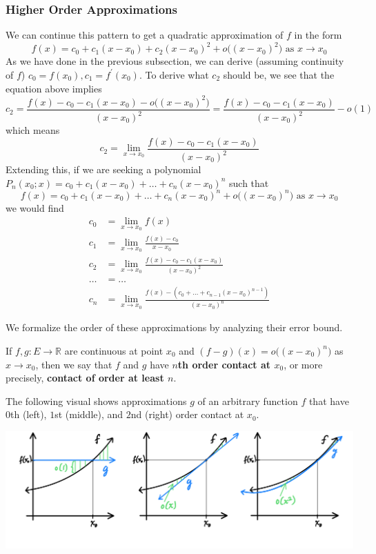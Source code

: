     \subsubsection{Higher Order Approximations}
    We can continue this pattern to get a quadratic approximation of $f$ in the form
    \[f(x) = c_0 + c_1 (x - x_0) + c_2 (x - x_0)^2 + o\big((x - x_0)^2 \big) \text{ as } x \rightarrow x_0\]
    As we have done in the previous subsection, we can derive (assuming continuity of $f$) $c_0 = f(x_0), c_1 = f^\prime (x_0)$. To derive what $c_2$ should be, we see that the equation above implies
    \[c_2 = \frac{f(x) - c_0 - c_1 (x - x_0) - o\big((x - x_0)^2 \big)}{(x - x_0)^2} = \frac{f(x) - c_0 - c_1 (x - x_0)}{(x - x_0)^2} - o(1)\]
    which means
    \[c_2 = \lim_{x \rightarrow x_0} \frac{f(x) - c_0 - c_1 (x - x_0)}{(x - x_0)^2}\]
    Extending this, if we are seeking a polynomial $P_n(x_0; x) = c_0 + c_1 (x - x_0) + \ldots + c_n (x - x_0)^n$ such that
    \[f(x) = c_0 + c_1 (x - x_0) + \ldots + c_n (x - x_0)^n + o\big((x - x_0)^n\big) \text{ as } x \rightarrow x_0\]
    we would find 
    \begin{align*}
        c_0 & = \lim_{x \rightarrow x_0} f(x) \\
        c_1 & = \lim_{x \rightarrow x_0} \frac{f(x) - c_0}{x - x_0} \\
        c_2 & = \lim_{x \rightarrow x_0} \frac{f(x) - c_0 - c_1 (x - x_0)}{(x - x_0)^2} \\
        \ldots & = \ldots \\
        c_n & = \lim_{x \rightarrow x_0} \frac{f(x) - (c_0 + \ldots + c_{n-1}(x - x_0)^{n-1})}{(x - x_0)^n}
    \end{align*}

    We formalize the order of these approximations by analyzing their error bound. 

    \begin{definition}
      If $f, g: E \longrightarrow \mathbb{R}$ are continuous at point $x_0$ and $(f - g) (x) = o\big( (x - x_0)^n \big)$ as $x \rightarrow x_0$, then we say that $f$ and $g$ have \textbf{$n$th order contact at $x_0$}, or more precisely, \textbf{contact of order at least $n$}. 

      The following visual shows approximations $g$ of an arbitrary function $f$ that have $0$th (left), $1$st (middle), and $2$nd (right) order contact at $x_0$. 
      \begin{center}
          \includegraphics[scale=0.25]{img/nth_order_contact.PNG}
      \end{center}
    \end{definition}

